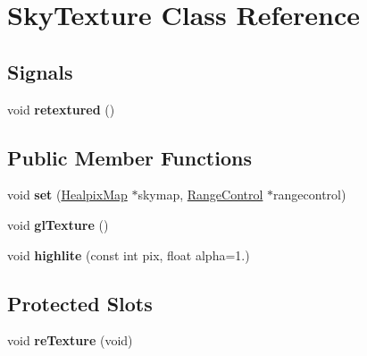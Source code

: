 \hypertarget{classSkyTexture}{
\section{SkyTexture Class Reference}
\label{classSkyTexture}
}
\subsection*{Signals}
\begin{DoxyCompactItemize}
\item 
\hypertarget{classSkyTexture_a197ffc23031e9963490cd9b7bcb0e3cf}{
void {\bfseries retextured} ()}
\label{classSkyTexture_a197ffc23031e9963490cd9b7bcb0e3cf}

\end{DoxyCompactItemize}
\subsection*{Public Member Functions}
\begin{DoxyCompactItemize}
\item 
\hypertarget{classSkyTexture_a07abc89f8af482702328537908009aa5}{
void {\bfseries set} (\hyperlink{classHealpixMap}{HealpixMap} $\ast$skymap, \hyperlink{classRangeControl}{RangeControl} $\ast$rangecontrol)}
\label{classSkyTexture_a07abc89f8af482702328537908009aa5}

\item 
\hypertarget{classSkyTexture_a62668f24f54e64f7764b0b31d38554c4}{
void {\bfseries glTexture} ()}
\label{classSkyTexture_a62668f24f54e64f7764b0b31d38554c4}

\item 
\hypertarget{classSkyTexture_aaccacddae0ffb39431ca8abff9c90885}{
void {\bfseries highlite} (const int pix, float alpha=1.)}
\label{classSkyTexture_aaccacddae0ffb39431ca8abff9c90885}

\end{DoxyCompactItemize}
\subsection*{Protected Slots}
\begin{DoxyCompactItemize}
\item 
\hypertarget{classSkyTexture_afba7b6e31e309f7405da4d19ee97c9d3}{
void {\bfseries reTexture} (void)}
\label{classSkyTexture_afba7b6e31e309f7405da4d19ee97c9d3}

\end{DoxyCompactItemize}
